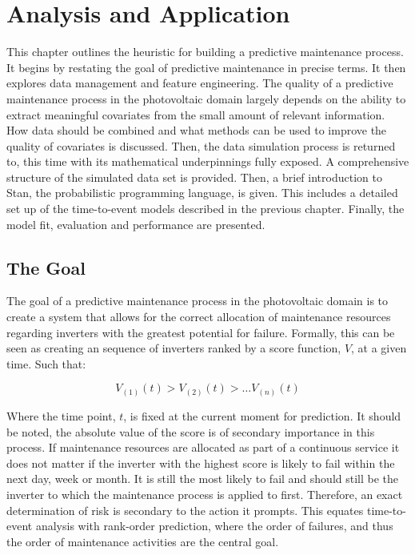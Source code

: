 \chapter*{Analysis and Application}
\thispagestyle{empty}



This chapter outlines the heuristic for building a predictive maintenance process. It begins by restating the goal of predictive maintenance in precise terms. It then explores data management and feature engineering. The quality of a predictive maintenance process in the photovoltaic domain largely depends on the ability to extract meaningful covariates from the small amount of relevant information. How data should be combined and what methods can be used to improve the quality of covariates is discussed. Then, the data simulation process is returned to, this time with its mathematical underpinnings fully exposed. A comprehensive structure of the simulated data set is provided. Then, a brief introduction to Stan, the probabilistic programming language, is given. This includes a detailed set up of the time-to-event models described in the previous chapter. Finally, the model fit, evaluation and performance are presented.

\section*{The Goal}


The goal of a predictive maintenance process in the photovoltaic domain is to create a system that allows for the correct allocation of maintenance resources regarding inverters with the greatest potential for failure. Formally, this can be seen as creating an sequence of inverters ranked by a score function, $V$, at a given time. Such that:

$$ V_{(1)}(t) > V_{(2)}(t) > \dots V_{(n)}(t) $$

Where the time point, $t$, is fixed at the current moment for prediction. It should be noted, the absolute value of the score is of secondary importance in this process. If maintenance resources are allocated as part of a continuous service it does not matter if the inverter with the highest score is likely to fail within the next day, week or month. It is still the most likely to fail and should still be the inverter to which the maintenance process is applied to first. Therefore, an exact determination of risk is secondary to the action it prompts. This equates time-to-event analysis with rank-order prediction, where the order of failures, and thus the order of maintenance activities are the central goal. 



